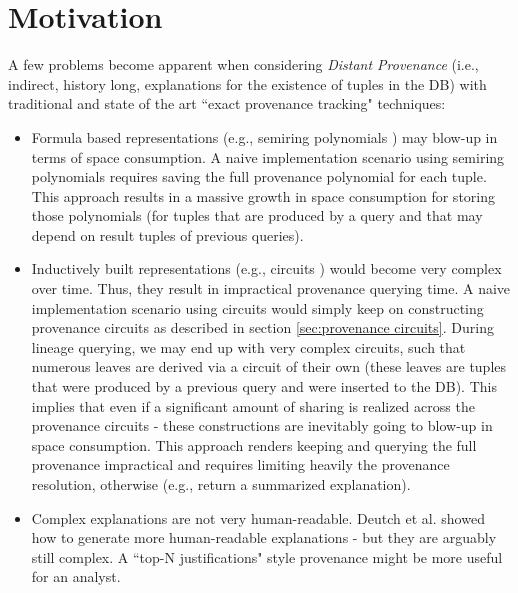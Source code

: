 \section{Motivation}\label{sec:motivation_approx}
A few problems become apparent when considering \textit{Distant Provenance} (i.e., indirect, history long, explanations for the existence of tuples in the DB) with traditional and state of the art ``exact provenance tracking" techniques:
\begin{itemize}
    \item Formula based representations (e.g., semiring polynomials \cite{green2007provenance}) may blow-up in terms of space consumption.
    A naive implementation scenario using semiring polynomials requires saving the full provenance polynomial for each tuple. 
    This approach results in a massive growth in space consumption for storing those polynomials (for tuples that are produced by a query and that may depend on result tuples of previous queries).
    \item Inductively built representations (e.g., circuits \cite{Deutch2014, Senellart2017}) would become very complex over time. Thus, they result in impractical provenance querying time. A naive implementation scenario using circuits would simply keep on constructing provenance circuits as described in section \ref{sec:provenance circuits}. During lineage querying, we may end up with very complex circuits, such that numerous leaves are derived via a circuit of their own (these leaves are tuples that were produced by a previous query and were inserted to the DB). This implies that even if a significant amount of sharing is realized across the provenance circuits - these constructions are inevitably going to blow-up in space consumption. This approach renders keeping and querying the full provenance impractical and requires limiting heavily the provenance resolution, otherwise (e.g., return a summarized explanation). 
    \item Complex explanations are not very human-readable. Deutch et al. \cite{Deutch2017} showed how to generate more human-readable explanations - but they are arguably still complex. A ``top-N justifications" style provenance might be more useful for an analyst. 
\end{itemize}


